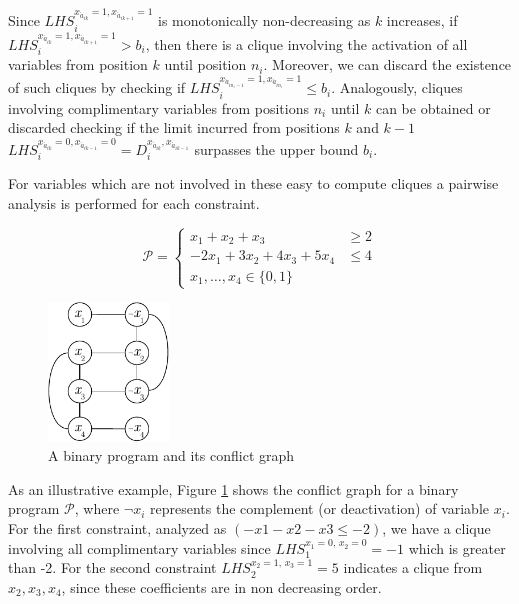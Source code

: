 \documentclass{endm}
\begin{document}
Since $LHS_{i}^{x_{\acute{a}_{ik}} = 1, x_{\acute{a}_{ik+1}} = 1}$ is monotonically non-decreasing as $k$ increases, if $LHS_{i}^{x_{\acute{a}_{ik}} = 1, x_{\acute{a}_{ik+1}} = 1} > b_{i}$, then there is a clique involving the activation of all variables from position $k$ until position $n_i$. Moreover, we can discard the existence of such cliques by checking if $LHS_{i}^{x_{\acute{a}_{in_i-1}} = 1, x_{\acute{a}_{in_i}} = 1} \leq b_i$. Analogously, cliques involving complimentary variables from positions $n_i$ until $k$ can be obtained or discarded checking if the limit incurred from positions $k$ and $k-1$  $LHS_{i}^{x_{\acute{a}_{ik}} = 0, x_{\acute{a}_{ik-1}} = 0} = D_{i}^{x_{\acute{a}_{ik}}, x_{\acute{a}_{ik-1}}} $ surpasses the upper bound $b_i$.

For variables which are not involved in these easy to compute cliques a pairwise analysis is performed for each constraint. 



\begin{figure}[h]
\begin{minipage}[b]{.5\textwidth}
\[
\mathcal{P} = \left\{
\begin{array}{lr}
x_1+x_2+x_3 & \geq 2 \\
-2x_{1}+3x_{2}+4x_{3}+5x_{4} & \leq 4 \\
x_{1},\ldots,x_{4}\in\{0,1\}
\end{array}
\right.
\]

\end{minipage}
\begin{minipage}{.5\textwidth}
	\centering
	\includegraphics[width=3.2cm]{cGraph.pdf}
\end{minipage}
\caption{A binary program and its conflict graph}\label{graph}
\end{figure}


As an illustrative example, Figure \ref{graph} shows the conflict graph for a binary program $\mathcal{P}$, where $\neg x_i$ represents the complement (or deactivation) of variable $x_i$.  For the first constraint, analyzed as $(-x1-x2-x3\leq-2)$, we have a clique involving all complimentary variables since $LHS_1^{x_1=0,\, x_2=0}=-1$ which is greater than -2. For the second constraint $LHS_2^{x_2=1,\, x_3=1}=5$ indicates a clique from $x_2,x_3,x_4$, since these coefficients are in non decreasing order.
\end{document}
